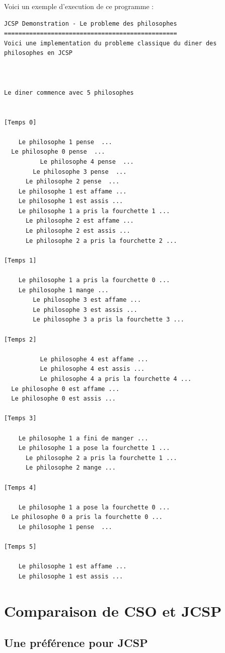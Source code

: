 \documentclass[a4paper,11pt,french]{report}
\begin{document}
Voici un exemple d'execution de ce programme :
\begin{lstlisting}[frame=trBL,title={Dîner des philosophes : exemple d'execution}]
JCSP Demonstration - Le probleme des philosophes
================================================
Voici une implementation du probleme classique du diner des philosophes en JCSP 



Le diner commence avec 5 philosophes


[Temps 0]

    Le philosophe 1 pense  ...
  Le philosophe 0 pense  ...
          Le philosophe 4 pense  ...
        Le philosophe 3 pense  ...
      Le philosophe 2 pense  ...
    Le philosophe 1 est affame ...
    Le philosophe 1 est assis ...
    Le philosophe 1 a pris la fourchette 1 ...
      Le philosophe 2 est affame ...
      Le philosophe 2 est assis ...
      Le philosophe 2 a pris la fourchette 2 ...

[Temps 1]

    Le philosophe 1 a pris la fourchette 0 ...
    Le philosophe 1 mange ...
        Le philosophe 3 est affame ...
        Le philosophe 3 est assis ...
        Le philosophe 3 a pris la fourchette 3 ...

[Temps 2]

          Le philosophe 4 est affame ...
          Le philosophe 4 est assis ...
          Le philosophe 4 a pris la fourchette 4 ...
  Le philosophe 0 est affame ...
  Le philosophe 0 est assis ...

[Temps 3]

    Le philosophe 1 a fini de manger ...
    Le philosophe 1 a pose la fourchette 1 ...
      Le philosophe 2 a pris la fourchette 1 ...
      Le philosophe 2 mange ...

[Temps 4]

    Le philosophe 1 a pose la fourchette 0 ...
  Le philosophe 0 a pris la fourchette 0 ...
    Le philosophe 1 pense  ...

[Temps 5]

    Le philosophe 1 est affame ...
    Le philosophe 1 est assis ...
\end{lstlisting}



\part{Comparaison de CSO et JCSP}
\chapter{Une préférence pour JCSP}
\end{document}
